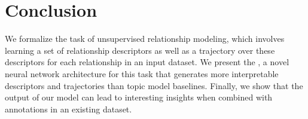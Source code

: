 \section{Conclusion}
\label{sec:conclusion}

We formalize the task of unsupervised relationship modeling, which
involves learning a set of relationship descriptors as well as a trajectory over
these descriptors for each relationship in an input dataset. We present the
\rmn, a novel neural network architecture for this task that generates more
interpretable descriptors and trajectories than topic model baselines. Finally,
we show that the output of our model can lead to interesting insights when
combined with annotations in an existing dataset.
